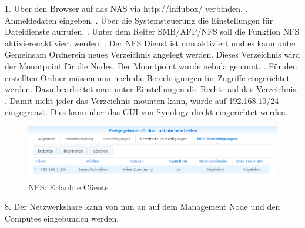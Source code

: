 1. Über den Browser auf das NAS via http://influbox/ verbinden. . Anmeldedaten eingeben. . Über die Systemsteuerung die Einstellungen für Dateidienste aufrufen. . Unter dem Reiter SMB/AFP/NFS soll die Funktion \grqq NFS aktivieren\grqq aktiviert werden. . Der NFS Dienst ist nun aktiviert und es kann unter \grqq Gemeinsam Ordner\grqq ein neues Verzeichnis angelegt werden. Dieses Verzeichnis wird der Mountpoint für die Nodes. Der Mountpoint wurde nebula genannt. . Für den erstellten Ordner müssen nun noch die Berechtigungen für Zugriffe eingerichtet werden. Dazu bearbeitet man unter Einstellungen die Rechte auf das Verzeichnis. . Damit nicht jeder das Verzeichnis mounten kann, wurde  auf 192.168.10/24  eingegrenzt. Dies kann über das GUI von Synology direkt eingerichtet werden.
\begin{figure}[H]
	\centering
	\includegraphics[scale=0.8]{Bilder/nfs_net.png}
	\caption{NFS: Erlaubte Clients}
\end{figure}
8. Der Netzwerkshare kann von nun an auf dem Management Node und den Computes eingebunden werden.